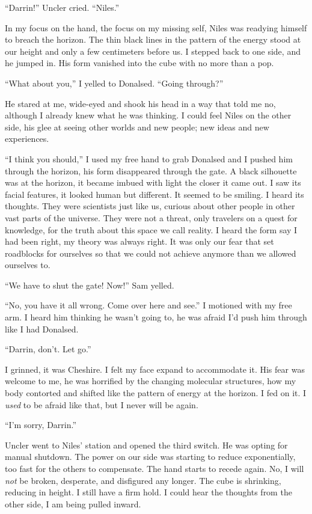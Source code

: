 \documentclass[
]{article}
\begin{document}
``Darrin!'' Uncler cried. ``Niles.''

In my focus on the hand, the focus on my missing self, Niles was
readying himself to breach the horizon. The thin black lines in the
pattern of the energy stood at our height and only a few centimeters
before us. I stepped back to one side, and he jumped in. His form
vanished into the cube with no more than a pop.

``What about you,'' I yelled to Donalsed. ``Going through?''

He stared at me, wide-eyed and shook his head in a way that told me no,
although I already knew what he was thinking. I could feel Niles on the
other side, his glee at seeing other worlds and new people; new ideas
and new experiences.

``I think you should,'' I used my free hand to grab Donalsed and I
pushed him through the horizon, his form disappeared through the gate. A
black silhouette was at the horizon, it became imbued with light the
closer it came out. I saw its facial features, it looked human but
different. It seemed to be smiling. I heard its thoughts. They were
scientists just like us, curious about other people in other vast parts
of the universe. They were not a threat, only travelers on a quest for
knowledge, for the truth about this space we call reality. I heard the
form say I had been right, my theory was always right. It was only our
fear that set roadblocks for ourselves so that we could not achieve
anymore than we allowed ourselves to.

``We have to shut the gate! Now!'' Sam yelled.

``No, you have it all wrong. Come over here and see.'' I motioned with
my free arm. I heard him thinking he wasn't going to, he was afraid I'd
push him through like I had Donalsed.

``Darrin, don't. Let go.''

I grinned, it was Cheshire. I felt my face expand to accommodate it. His
fear was welcome to me, he was horrified by the changing molecular
structures, how my body contorted and shifted like the pattern of energy
at the horizon. I fed on it. I \emph{used} to be afraid like that, but I
never will be again.

``I'm sorry, Darrin.''

Uncler went to Niles' station and opened the third switch. He was opting
for manual shutdown. The power on our side was starting to reduce
exponentially, too fast for the others to compensate. The hand starts to
recede again. No, I will \emph{not} be broken, desperate, and disfigured
any longer. The cube is shrinking, reducing in height. I still have a
firm hold. I could hear the thoughts from the other side, I am being
pulled inward.
\end{document}
